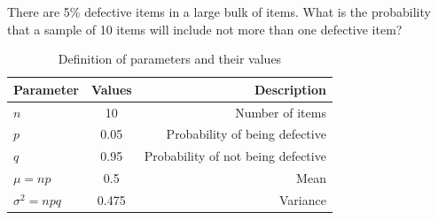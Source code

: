 \documentclass[]{article}
\begin{document}
\providecommand{\qfunc}[1]{\ensuremath{Q\left(#1\right)}}
\providecommand{\gauss}[2]{\mathcal{N}\ensuremath{\left(#1,#2\right)}}
\providecommand{\diff}[2]{\ensuremath{\frac{d{#1}}{d{#2}}}}
\providecommand{\myceil}[1]{\left \lceil #1 \right \rceil }
\newcommand\figref{Fig.~\ref}
\newcommand\tabref{Table~\ref}
\newcommand{\sinc}{\,\text{sinc}\,}
\newcommand{\rect}{\,\text{rect}\,}

\let\vec\mathbf

There are 5\% defective items in a large bulk of items. What is the probability 
that a sample of 10 items will include not more than one defective item?
\solution
\begin{table}[!ht]
\centering
\begin{tabular}{|l|c|r|}
    \hline
    Parameter & Values & Description\\
    \hline
    $n$ & 10 & Number of items\\
    \hline
    $p$ & 0.05 & Probability of being defective\\
    \hline
    $q$ & 0.95 & Probability of not being defective\\
    \hline
    $\mu = np$ & 0.5 & Mean\\
    \hline
    ${\sigma}^2 = npq$ & 0.475 & Variance\\
    \hline
\end{tabular}
\caption{Definition of parameters and their values}
\label{tab:gaussian/9/3/7}
\end{table}
\end{document}
